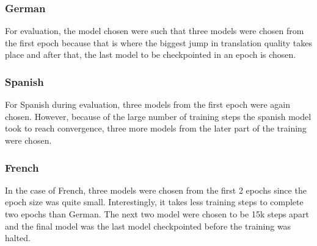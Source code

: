 \documentclass[12pt,a4paper,twoside,openright]{report}
\begin{document}
\subsubsection{German}
For evaluation, the model chosen were such that three models were chosen from the first epoch because that is where the biggest jump in translation quality takes place and after that, the last model to be checkpointed in an epoch is chosen.

\subsubsection{Spanish}
For Spanish during evaluation, three models from the first epoch were again chosen. However, because of the large number of training steps the spanish model took to reach convergence, three more models from the later part of the training were chosen.

\subsubsection{French}
In the case of French, three models were chosen from the first 2 epochs since the epoch size was quite small. Interestingly, it takes less training steps to complete two epochs than German. The next two model were chosen to be 15k steps apart and the final model was the last model checkpointed before the training was halted.
\end{document}
